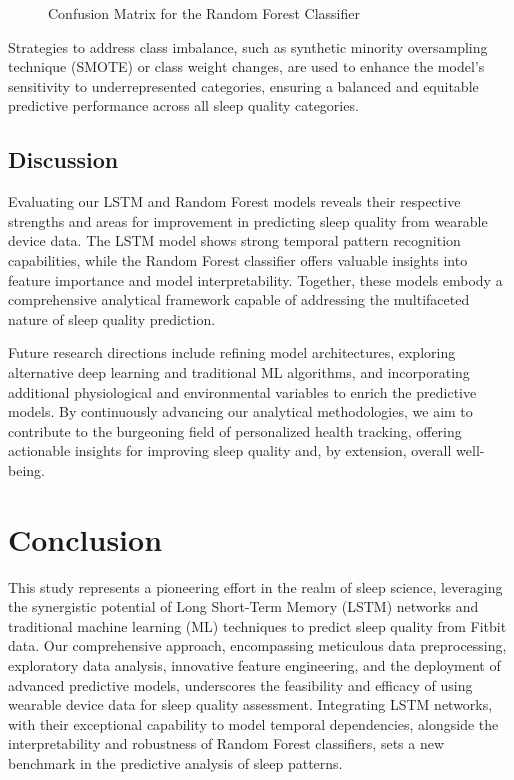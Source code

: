 \documentclass[10pt]{extarticle}
\begin{document}
\begin{figure}[H]
    \centering
    \caption{Confusion Matrix for the Random Forest Classifier}
\end{figure}

Strategies to address class imbalance, such as synthetic minority oversampling technique (SMOTE) or class weight changes, are used to enhance the model's sensitivity to underrepresented categories, ensuring a balanced and equitable predictive performance across all sleep quality categories.

\subsection{Discussion}

Evaluating our LSTM and Random Forest models reveals their respective strengths and areas for improvement in predicting sleep quality from wearable device data. The LSTM model shows strong temporal pattern recognition capabilities, while the Random Forest classifier offers valuable insights into feature importance and model interpretability. Together, these models embody a comprehensive analytical framework capable of addressing the multifaceted nature of sleep quality prediction.

Future research directions include refining model architectures, exploring alternative deep learning and traditional ML algorithms, and incorporating additional physiological and environmental variables to enrich the predictive models. By continuously advancing our analytical methodologies, we aim to contribute to the burgeoning field of personalized health tracking, offering actionable insights for improving sleep quality and, by extension, overall well-being.

\section{Conclusion}

This study represents a pioneering effort in the realm of sleep science, leveraging the synergistic potential of Long Short-Term Memory (LSTM) networks and traditional machine learning (ML) techniques to predict sleep quality from Fitbit data. Our comprehensive approach, encompassing meticulous data preprocessing, exploratory data analysis, innovative feature engineering, and the deployment of advanced predictive models, underscores the feasibility and efficacy of using wearable device data for sleep quality assessment. Integrating LSTM networks, with their exceptional capability to model temporal dependencies, alongside the interpretability and robustness of Random Forest classifiers, sets a new benchmark in the predictive analysis of sleep patterns.
\end{document}
